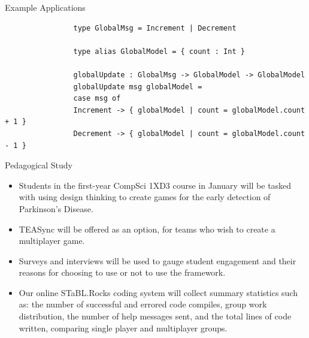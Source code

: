 \documentclass[22pt]{beamer}
\begin{document}
\begin{frame}[fragile]
\begin{textblock}{7.25}
\begin{block}{\fontsize{37}{20}\selectfont Example Applications}
            \begin{Verbatim}
                type GlobalMsg = Increment | Decrement

                type alias GlobalModel = { count : Int }

                globalUpdate : GlobalMsg -> GlobalModel -> GlobalModel
                globalUpdate msg globalModel =
                case msg of
                Increment -> { globalModel | count = globalModel.count + 1 }
                Decrement -> { globalModel | count = globalModel.count - 1 }
            \end{Verbatim}

            \vspace{-5mm}
        \end{block}


        \begin{block}{\fontsize{37}{20}\selectfont Pedagogical Study}
            \begin{itemize}
                \item Students in the first-year CompSci 1XD3 course in January will be tasked with using design
                      thinking to create games for the early detection of Parkinson's Disease.
                \item TEASync will be offered as an option, for teams who wish to create a multiplayer game.
                \item Surveys and interviews will be used to gauge student engagement and their reasons for
                      choosing to use or not to use the framework.
                \item Our online STaBL.Rocks coding system will collect summary statistics such as: the number of
                      successful and errored code compiles, group work distribution, the number of help messages
                      sent, and the total lines of code written, comparing single player and multiplayer groups.
            \end{itemize}



\end{block}
\end{textblock}
\end{frame}
\end{document}
